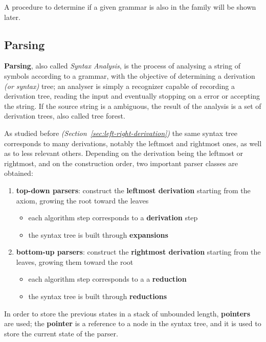 \documentclass[english]{article}
\begin{document}
A procedure to determine if a given \CF grammar is also in the \DET family will be shown later. %

\subsection{Parsing}
\label{sec:parsing}

\textbf{Parsing}, also called \textit{Syntax Analysis}, is the process of analysing a string of symbols according to a grammar, with the objective of determining a derivation \textit{(or syntax)} tree;
an analyser is simply a recognizer capable of recording a derivation tree, reading the input and eventually stopping on a error or accepting the string.
If the source string is a ambiguous, the result of the analysis is a set of derivation trees, also called tree forest.

As studied before \textit{(Section~\ref{sec:left-right-derivation})}
the same syntax tree corresponds to many derivations, notably the leftmost and rightmost ones, as well as to less relevant others.
Depending on the derivation being the leftmost or rightmost, and on the construction order, two important parser classes are obtained:

\begin{enumerate}
  \item \textbf{top-down parsers}: construct the \textbf{leftmost derivation} starting from the axiom, growing the root toward the leaves
        \begin{itemize}
          \item each algorithm step corresponds to a \textbf{derivation} step
          \item the syntax tree is built through \textbf{expansions}
        \end{itemize}
  \item \textbf{bottom-up parsers}: construct the \textbf{rightmost derivation} starting from the leaves, growing them toward the root
        \begin{itemize}
          \item each algorithm step corresponds to a a \textbf{reduction}
          \item the syntax tree is built through \textbf{reductions}
        \end{itemize}
\end{enumerate}

\bigskip
In order to store the previous states in a stack of unbounded length, \textbf{pointers} are used;
the \textbf{pointer} is a reference to a node in the syntax tree, and it is used to store the current state of the parser.
\end{document}
